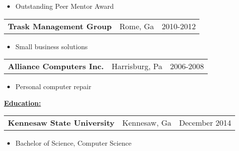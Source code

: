 \documentclass{book}
\newenvironment{myitemize}
{ \begin{itemize}
	\setlength{\itemsep}{0pt}
	\setlength{\parskip}{0pt}
	\setlength{\parsep}{0pt}     }
{ \end{itemize}                  }
\begin{document}
	\begin{myitemize}
		\item Outstanding Peer Mentor Award 
	\end{myitemize} 


\begin{tabular}{L{3in}L{1.75in}R{1.75in}}

	 {\large {\bfseries Trask Management Group}} & Rome, Ga & 2010-2012 \\

\end{tabular}

\begin{myitemize}
	
	\item Small business solutions

\end{myitemize}

\begin{tabular}{L{3in}L{1.75in}R{1.75in}}

	 {\large {\bfseries Alliance Computers Inc.}} & Harrisburg, Pa & 2006-2008 \\

\end{tabular}

\begin{myitemize}
	
	\item Personal computer repair

\end{myitemize}

\underline{\Large {\bfseries Education:}}

\enspace

\begin{tabular}{L{3in}L{1.75in}R{1.75in}}

	{\large {\bfseries Kennesaw State University}} & Kennesaw, Ga & December 2014 \\%

\end{tabular}

\begin{myitemize}

	\item Bachelor of Science, Computer Science 

\end{myitemize}
\end{document}
